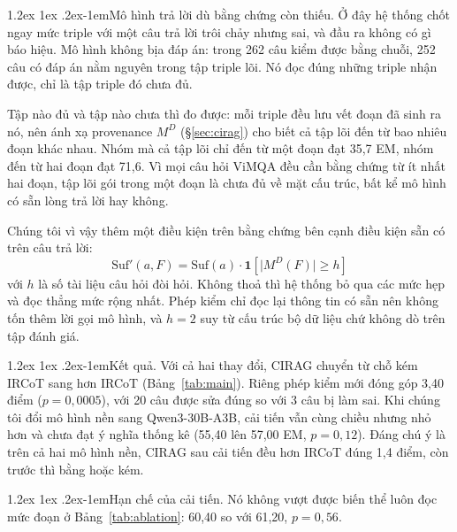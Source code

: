 \documentclass[11pt]{article}
\makeatletter
\renewcommand\paragraph{\@startsection{paragraph}{4}{\z@}%
  {1.2ex \@plus1ex \@minus.2ex}{-1em}{\normalfont\normalsize\bfseries}}
\makeatother
\begin{document}
\paragraph{Mô hình trả lời dù bằng chứng còn thiếu.} Ở đây hệ thống chốt ngay mức triple
với một câu trả lời trôi chảy nhưng sai, và đầu ra không có gì báo hiệu. Mô hình không bịa
đáp án: trong 262 câu kiểm được bằng chuỗi, 252 câu có đáp án nằm nguyên trong tập triple
lõi. Nó đọc đúng những triple nhận được, chỉ là tập triple đó chưa đủ.

Tập nào đủ và tập nào chưa thì đo được: mỗi triple đều lưu vết đoạn đã sinh ra nó, nên ánh
xạ provenance $M^D$ (\S\ref{sec:cirag}) cho biết cả tập lõi đến từ bao nhiêu đoạn khác nhau.
Nhóm mà cả tập lõi chỉ đến từ một đoạn đạt 35,7 EM, nhóm đến từ hai đoạn đạt 71,6. Vì mọi câu hỏi ViMQA đều cần bằng chứng từ ít nhất hai đoạn, tập lõi gói trong một đoạn
là chưa đủ về mặt cấu trúc, bất kể mô hình có sẵn lòng trả lời hay không.

Chúng tôi vì vậy thêm một điều kiện trên bằng chứng bên cạnh điều kiện sẵn có trên câu trả
lời:
\begin{equation}
\label{eq:newsuf}
\mathrm{Suf}'(a, F) = \mathrm{Suf}(a) \cdot \mathbf{1}\!\left[\lvert M^D(F) \rvert \ge h\right]
\end{equation}
với $h$ là số tài liệu câu hỏi đòi hỏi. Không thoả thì hệ thống bỏ qua các mức hẹp và đọc
thẳng mức rộng nhất. Phép kiểm chỉ đọc lại thông tin có sẵn nên không tốn thêm lời gọi mô
hình, và $h = 2$ suy từ cấu trúc bộ dữ liệu chứ không dò trên tập đánh giá.

\paragraph{Kết quả.} Với cả hai thay đổi, CIRAG chuyển từ chỗ kém IRCoT sang hơn IRCoT
(Bảng~\ref{tab:main}). Riêng phép kiểm mới đóng góp 3,40 điểm ($p = 0{,}0005$), với 20
câu được sửa đúng so với 3 câu bị làm sai. Khi chúng tôi đổi mô hình nền sang Qwen3-30B-A3B, cải tiến vẫn cùng chiều nhưng nhỏ
hơn và chưa đạt ý nghĩa thống kê (55,40 lên 57,00 EM, $p = 0{,}12$). Đáng chú ý là trên cả
hai mô hình nền, CIRAG sau cải tiến đều hơn IRCoT đúng 1,4 điểm, còn trước thì bằng hoặc kém.

\paragraph{Hạn chế của cải tiến.} Nó không vượt được biến thể luôn đọc mức đoạn ở
Bảng~\ref{tab:ablation}: 60,40 so với 61,20, $p = 0{,}56$.
\end{document}
